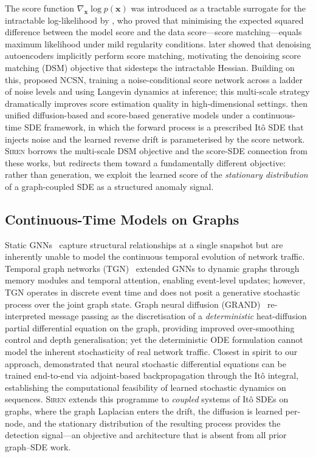The score function $\nabla_{\mathbf{x}} \log p(\mathbf{x})$ was introduced
as a tractable surrogate for the intractable log-likelihood by
\citet{Hyvarinen2005score}, who proved that minimising the expected squared
difference between the model score and the data score---score
matching---equals maximum likelihood under mild regularity conditions.
\citet{Vincent2011dsm} later showed that denoising autoencoders implicitly
perform score matching, motivating the denoising score matching (DSM)
objective that sidesteps the intractable Hessian.
Building on this, \citet{Song2019ncsn} proposed NCSN, training a
noise-conditional score network across a ladder of noise levels and using
Langevin dynamics at inference; this multi-scale strategy dramatically
improves score estimation quality in high-dimensional settings.
\citet{Song2021sde} then unified diffusion-based and score-based
generative models under a continuous-time SDE framework, in which the
forward process is a prescribed It\^o SDE that injects noise and the learned
reverse drift is parameterised by the score network.
\textsc{Siren} borrows the multi-scale DSM objective and the score-SDE
connection from these works, but redirects them toward a fundamentally
different objective: rather than generation, we exploit the learned score of
the \emph{stationary distribution} of a graph-coupled SDE as a structured
anomaly signal.

\subsection{Continuous-Time Models on Graphs}

Static GNNs~\citep{Kipf2017gcn,Hamilton2017graphsage} capture structural
relationships at a single snapshot but are inherently unable to model the
continuous temporal evolution of network traffic.
Temporal graph networks (TGN)~\citep{Rossi2020tgn} extended GNNs to dynamic
graphs through memory modules and temporal attention, enabling event-level
updates; however, TGN operates in discrete event time and does not posit a
generative stochastic process over the joint graph state.
Graph neural diffusion (GRAND)~\citep{Chamberlain2021grand}
re-interpreted message passing as the discretisation of a \emph{deterministic}
heat-diffusion partial differential equation on the graph, providing improved
over-smoothing control and depth generalisation; yet the deterministic ODE
formulation cannot model the inherent stochasticity of real network traffic.
Closest in spirit to our approach, \citet{Kidger2021nsde} demonstrated that
neural stochastic differential equations can be trained end-to-end via
adjoint-based backpropagation through the It\^o integral, establishing the
computational feasibility of learned stochastic dynamics on sequences.
\textsc{Siren} extends this programme to \emph{coupled} systems of It\^o SDEs
on graphs, where the graph Laplacian enters the drift, the diffusion is
learned per-node, and the stationary distribution of the resulting process
provides the detection signal---an objective and architecture that is absent
from all prior graph--SDE work.

